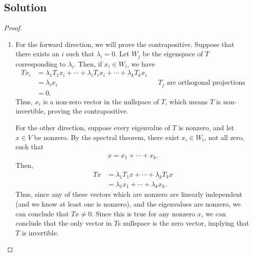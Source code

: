 \documentclass[10pt,a4paper]{article}
\theoremstyle{definition}
\begin{document}
\subsection*{Solution}
\begin{proof}
\begin{enumerate}
\item For the forward direction, we will prove the contrapositive. Suppose that there exists an $i$ such that $\lambda_i = 0$. Let $W_j$ be the eigenspace of $T$ corresponding to $\lambda_i$. Then, if $x_i \in W_i$, we have
\begin{align*}
Tx_i &= \lambda_1 T_1 x_i + \cdots + \lambda_i T_i x_i + \cdots + \lambda_k T_k x_i\\
&= \lambda_i x_i && T_j \text{ are orthogonal projections}\\
&= 0.
\end{align*}
Thus, $x_i$ is a non-zero vector in the nullspace of $T$, which means $T$ is non-invertible, proving the contrapositive.

For the other direction, suppose every eigenvalue of $T$ is nonzero, and let $x \in V$ be nonzero. By the spectral theorem, there exist $x_i \in W_i$, not all zero, such that
\begin{align*}
x = x_1 + \cdots + x_k.
\end{align*}
Then, 
\begin{align*}
Tx &= \lambda_1 T_1 x  + \cdots + \lambda_k T_k x\\
&= \lambda_1 x_1 + \cdots + \lambda_k x_k.
\end{align*}
Thus, since any of these vectors which are nonzero are linearly independent (and we know at least one is nonzero), and the eigenvalues are nonzero, we can conclude that $Tx \not = 0$. Since this is true for any nonzero $x$, we can conclude that the only vector in $T$s nullspace is the zero vector, implying that $T$ is invertible.


\end{enumerate}
\end{proof}
\end{document}
